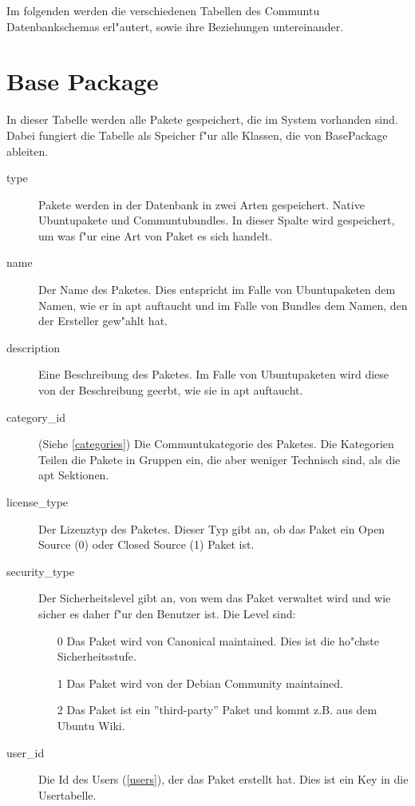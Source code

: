 \documentclass{article}
\begin{document}
\tableofcontents
\newpage

Im folgenden werden die verschiedenen Tabellen des Communtu Datenbankschemas erl"autert, sowie ihre Beziehungen untereinander.

\section{Base Package}
\label{packages}

In dieser Tabelle werden alle Pakete gespeichert, die im System vorhanden sind. Dabei fungiert die Tabelle als Speicher f"ur alle Klassen, die von BasePackage ableiten.

\begin{description}

\item[type] Pakete werden in der Datenbank in zwei Arten gespeichert. Native Ubuntupakete und Communtubundles. In dieser Spalte wird gespeichert, um was f"ur eine Art von Paket es sich handelt.
\item[name] Der Name des Paketes. Dies entspricht im Falle von Ubuntupaketen dem Namen, wie er in apt auftaucht und im Falle von Bundles dem Namen, den der Ersteller gew"ahlt hat.
\item[description] Eine Beschreibung des Paketes. Im Falle von Ubuntupaketen wird diese von der Beschreibung geerbt, wie sie in apt auftaucht.
\item[category\_id] (Siehe \ref{categories}) Die Communtukategorie des Paketes. Die Kategorien Teilen die Pakete in Gruppen ein, die aber weniger Technisch sind, als die apt Sektionen.
\item[license\_type] Der Lizenztyp des Paketes. Dieser Typ gibt an, ob das Paket ein Open Source (0) oder Closed Source (1) Paket ist.
\item[security\_type] Der Sicherheitslevel gibt an, von wem das Paket verwaltet wird und wie sicher es daher f"ur den Benutzer ist. Die Level sind:
    \begin{enumerate}
    \item[0] Das Paket wird von Canonical maintained. Dies ist die ho"chste Sicherheitsstufe.
    \item[1] Das Paket wird von der Debian Community maintained. 
    \item[2] Das Paket ist ein ''third-party'' Paket und kommt z.B. aus dem Ubuntu Wiki.
    \end{enumerate}
\item[user\_id] Die Id des Users (\ref{users}), der das Paket erstellt hat. Dies ist ein Key in die Usertabelle.

\end{description}
\end{document}
